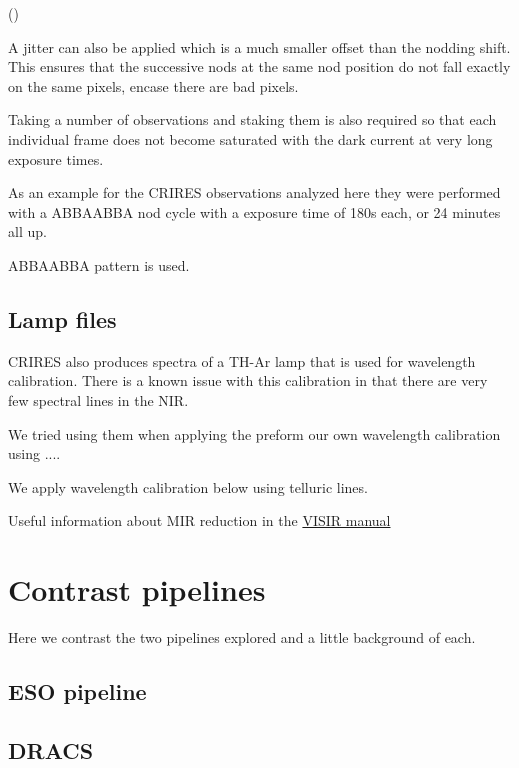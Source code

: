\missingfigure()

A jitter can also be applied which is a much smaller offset than the nodding shift. This ensures that the successive nods at the same nod position do not fall exactly on the same pixels, encase there are bad pixels.

Taking a number of observations and staking them is also required so that each individual frame does not become saturated with the dark current at very long exposure times.

As an example for the CRIRES observations analyzed here they were performed with a ABBAABBA nod cycle with a exposure time of 180s each, or 24 minutes all up.



ABBAABBA  pattern is used.

\subsection{Lamp files}
CRIRES also produces spectra of a TH-Ar lamp that is used for wavelength calibration. There is a known issue with this calibration in that there are very few spectral lines in the NIR. 

We tried using them when applying the preform our own wavelength calibration using ....

We apply wavelength calibration below using telluric lines.



Useful information about MIR reduction in the 
\href{https://www.eso.org/sci/facilities/paranal/instruments/visir/doc/VLT-MAN-ESO-14300-3514_2018-02-01.pdf}{VISIR manual}


\section{Contrast pipelines}

Here we contrast the two pipelines explored and a little background of each.

\subsection{ESO pipeline}


\subsection{DRACS}


